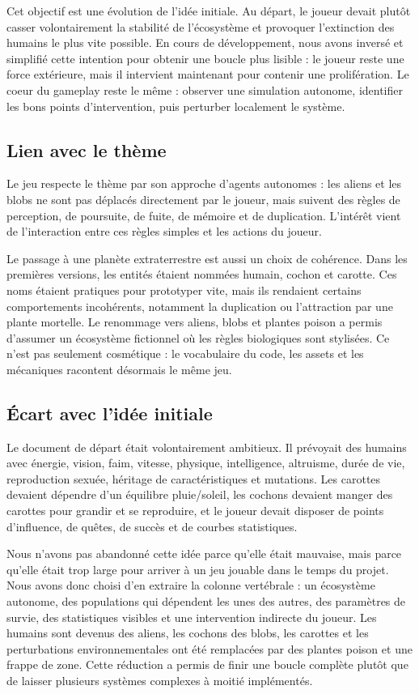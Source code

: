 ﻿\documentclass[11pt,a4paper]{article}
\begin{document}
Cet objectif est une évolution de l'idée initiale. Au départ, le joueur devait plutôt casser volontairement la stabilité de l'écosystème et provoquer l'extinction des humains le plus vite possible. En cours de développement, nous avons inversé et simplifié cette intention pour obtenir une boucle plus lisible : le joueur reste une force extérieure, mais il intervient maintenant pour contenir une prolifération. Le coeur du gameplay reste le même : observer une simulation autonome, identifier les bons points d'intervention, puis perturber localement le système.

\subsection{Lien avec le thème}

Le jeu respecte le thème par son approche d'agents autonomes : les aliens et les blobs ne sont pas déplacés directement par le joueur, mais suivent des règles de perception, de poursuite, de fuite, de mémoire et de duplication. L'intérêt vient de l'interaction entre ces règles simples et les actions du joueur.

Le passage à une planète extraterrestre est aussi un choix de cohérence. Dans les premières versions, les entités étaient nommées humain, cochon et carotte. Ces noms étaient pratiques pour prototyper vite, mais ils rendaient certains comportements incohérents, notamment la duplication ou l'attraction par une plante mortelle. Le renommage vers aliens, blobs et plantes poison a permis d'assumer un écosystème fictionnel où les règles biologiques sont stylisées. Ce n'est pas seulement cosmétique : le vocabulaire du code, les assets et les mécaniques racontent désormais le même jeu.

\subsection{Écart avec l'idée initiale}

Le document de départ était volontairement ambitieux. Il prévoyait des humains avec énergie, vision, faim, vitesse, physique, intelligence, altruisme, durée de vie, reproduction sexuée, héritage de caractéristiques et mutations. Les carottes devaient dépendre d'un équilibre pluie/soleil, les cochons devaient manger des carottes pour grandir et se reproduire, et le joueur devait disposer de points d'influence, de quêtes, de succès et de courbes statistiques.

Nous n'avons pas abandonné cette idée parce qu'elle était mauvaise, mais parce qu'elle était trop large pour arriver à un jeu jouable dans le temps du projet. Nous avons donc choisi d'en extraire la colonne vertébrale : un écosystème autonome, des populations qui dépendent les unes des autres, des paramètres de survie, des statistiques visibles et une intervention indirecte du joueur. Les humains sont devenus des aliens, les cochons des blobs, les carottes et les perturbations environnementales ont été remplacées par des plantes poison et une frappe de zone. Cette réduction a permis de finir une boucle complète plutôt que de laisser plusieurs systèmes complexes à moitié implémentés.
\end{document}

